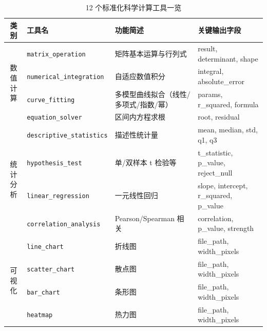 \begin{table}[htbp]
    \centering
    \caption{\label{tab:tool-list}12 个标准化科学计算工具一览}

    \begin{tabularx}{\linewidth}{clXX}
        \toprule
        类别 & 工具名 & 功能简述 & 关键输出字段 \\ \midrule

        \multirow{4}{*}{数值计算}
        & \texttt{matrix\_operation}
        & 矩阵基本运算与行列式
        & {\small result, determinant, shape}
        \\

        & \texttt{numerical\_integration}
        & 自适应数值积分
        & {\small integral, absolute\_error}
        \\

        & \texttt{curve\_fitting}
        & 多模型曲线拟合（线性/多项式/指数/幂）
        & {\small params, r\_squared, formula}
        \\

        & \texttt{equation\_solver}
        & 区间内方程求根
        & {\small root, residual}
        \\ \midrule

        \multirow{4}{*}{统计分析}
        & \texttt{descriptive\_statistics}
        & 描述性统计量
        & {\small mean, median, std, q1, q3}
        \\

        & \texttt{hypothesis\_test}
        & 单/双样本 t 检验等
        & {\small t\_statistic, p\_value, reject\_null}
        \\

        & \texttt{linear\_regression}
        & 一元线性回归
        & {\small slope, intercept, r\_squared, p\_value}
        \\

        & \texttt{correlation\_analysis}
        & Pearson/Spearman 相关
        & {\small correlation, p\_value, strength}
        \\ \midrule

        \multirow{4}{*}{可视化}
        & \texttt{line\_chart}
        & 折线图
        & {\small file\_path, width\_pixels}
        \\

        & \texttt{scatter\_chart}
        & 散点图
        & {\small file\_path, width\_pixels}
        \\

        & \texttt{bar\_chart}
        & 条形图
        & {\small file\_path, width\_pixels}
        \\

        & \texttt{heatmap}
        & 热力图
        & {\small file\_path, width\_pixels}
        \\ \bottomrule

    \end{tabularx}
\end{table}


